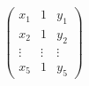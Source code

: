 \documentclass[preview]{standalone}
\begin{document}
\begin{align*}
\left(\begin{array}{cc|c} x_1 & 1 & y_1 \\ x_2 & 1 & y_2 \\ \vdots & \vdots & \vdots \\ x_5 & 1 & y_5 \end{array}\right)
\end{align*}
\end{document}
